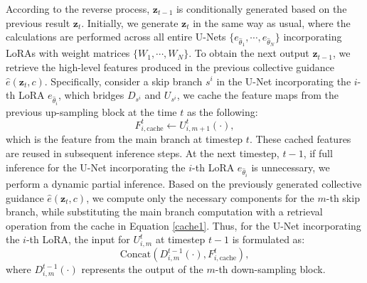 According to the reverse process, $\mathbf{z}_{t-1}$ is conditionally generated based on the previous result $\mathbf{z}_{t}$. Initially, we generate $\mathbf{z}_{t}$ in the same way as usual, where the calculations are performed across all entire U-Nets $\{e_{\hat\theta_{1}}, \cdots, e_{\hat\theta_{N}}\}$ incorporating LoRAs with weight matrices $\{W_{1}, \cdots, W_{N}\}$. To obtain the next output $\mathbf{z}_{t-1}$, we retrieve the high-level features produced in the previous collective guidance $\hat{e}(\mathbf{z}_{t},c)$. Specifically, consider a skip branch $s^{i}$ in the U-Net incorporating the $i$-th LoRA $e_{\hat\theta_{i}}$, which bridges $D_{s^{i}}$ and $U_{s^{i}}$, we cache the feature maps from the previous up-sampling block at the time $t$ as the following:
\vspace{-0pt}
\begin{equation}
\label{cache1}
    F^{t}_{i, \text{cache}} \leftarrow U^{t}_{i, m+1}(\cdot),
\end{equation}
which is the feature from the main branch at timestep $t$. These cached features are reused in subsequent inference steps. At the next timestep, $t-1$, if full inference for the U-Net incorporating the $i$-th LoRA $e_{\hat\theta_{i}}$ is unnecessary, we perform a dynamic partial inference. Based on the previously generated collective guidance $\hat{e}(\mathbf{z}_{t},c)$, we compute only the necessary components for the $m$-th skip branch, while substituting the main branch computation with a retrieval operation from the cache in Equation \ref{cache1}. Thus, for the U-Net incorporating the $i$-th LoRA, the input for $U^{t}_{i, m}$ at timestep $t - 1$ is formulated as:
\vspace{-5pt}
\begin{equation}
\label{cache2}
    \text{Concat}(D^{t-1}_{i, m}(\cdot), F^{t}_{i, \text{cache}}),
\end{equation}
where $D^{t-1}_{i, m}(\cdot)$ represents the output of the $m$-th down-sampling block.

